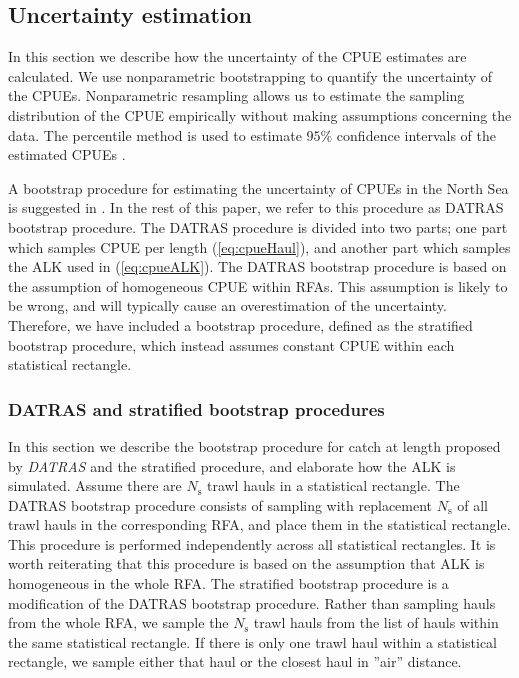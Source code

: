 \documentclass[a4paper 12pt]{article}
\numberwithin{equation}{section}
\begin{document}
\subsection{Uncertainty estimation}
\label{sec:uncertaintyestimation}
In this section we describe how the uncertainty of the CPUE estimates are calculated. We use nonparametric bootstrapping to quantify the uncertainty of the CPUEs. Nonparametric resampling allows us to estimate the sampling distribution of the CPUE empirically without making assumptions concerning the data. The percentile method is used to estimate $95\%$ confidence intervals of the estimated CPUEs \citep{carpenter2000bootstrap}. %

A bootstrap procedure for estimating the uncertainty of CPUEs in the North Sea is suggested in  \citet{ICES2013}. In the rest of this paper, we refer to this procedure as DATRAS bootstrap procedure. The DATRAS procedure is divided into two parts; one part which samples CPUE per length (\ref{eq:cpueHaul}), and another part which samples the ALK used in (\ref{eq:cpueALK}). The DATRAS bootstrap procedure is based on the assumption of homogeneous CPUE within RFAs. This assumption is likely to be wrong, and will typically cause an overestimation of the uncertainty. Therefore, we have included a bootstrap procedure, defined as the stratified bootstrap procedure, which instead assumes constant CPUE within each statistical rectangle. 

\subsubsection{DATRAS and stratified bootstrap procedures}
\indent In this section we describe the bootstrap procedure for catch at length proposed by \emph{DATRAS} \citep{ICES2013} and the stratified procedure, and elaborate how the ALK is simulated. Assume there are $N_{\text{s}}$ trawl hauls in a statistical rectangle. The DATRAS bootstrap procedure consists of sampling with replacement $N_{\text{s}}$ of all trawl hauls in the corresponding RFA, and place them in the statistical rectangle. This procedure is performed independently across all statistical rectangles. It is worth reiterating that this procedure is based on the assumption that ALK is homogeneous in the whole RFA. The stratified bootstrap procedure is a modification of the DATRAS bootstrap procedure. Rather than sampling hauls from the whole RFA, we  sample the $N_{\text{s}}$ trawl hauls from the list of hauls within the same statistical rectangle. If there is only one trawl haul within a statistical rectangle, we sample either that haul or the closest haul in ''air'' distance.
\end{document}
